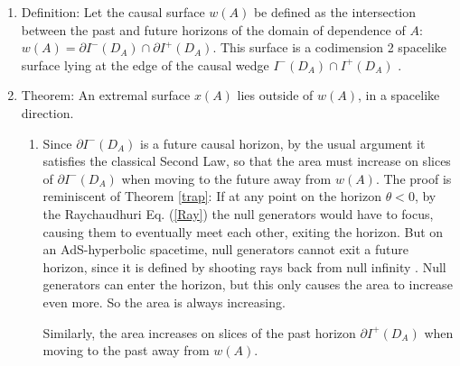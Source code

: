 \documentclass{article}
\begin{document}
\begin{enumerate}[resume]
\item Definition: Let the causal surface $w(A)$ be defined as the intersection between the past and future horizons of the domain of dependence of $A$: $w(A) = \partial I^-(D_A) \cap \partial I^+(D_A)$.  This surface is a codimension 2 spacelike surface lying at the edge of the causal wedge $I^-(D_A) \cap I^+(D_A)$ \cite{HRT07}.

\item\label{wm} Theorem: An extremal surface $x(A)$ lies outside of $w(A)$, in a spacelike direction. 
	\begin{enumerate}
	\item Since $\partial I^-(D_A)$ is a future causal horizon, by the usual argument \cite{HawkingEllis} it satisfies the classical Second Law, so that the area must increase on slices of $\partial I^-(D_A)$ when moving to the future away from $w(A)$.  The proof is reminiscent of Theorem \ref{trap}: If at any point on the horizon $\theta < 0$, by the Raychaudhuri Eq. (\ref{Ray}) the null generators would have to focus, causing them to eventually meet each other, exiting the horizon.  But on an AdS-hyperbolic spacetime, null generators cannot exit a future horizon, since it is defined by shooting rays back from null infinity \cite{HawkingEllis}.  Null generators can enter the horizon, but this only causes the area to increase even more.  So the area is always increasing.

Similarly, the area increases on slices of the past horizon $\partial I^+(D_A)$ when moving to the past away from $w(A)$.


\end{enumerate}
\end{enumerate}
\end{document}
